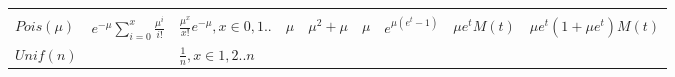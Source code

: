\documentclass[]{tufte-book}
\begin{document}
\begin{longtable}[]{@{}lllllllll@{}}
\begin{minipage}[t]{0.08\columnwidth}
\end{minipage} & \begin{minipage}[t]{0.08\columnwidth}\raggedright
\strut
\end{minipage} & \begin{minipage}[t]{0.08\columnwidth}\raggedright
\strut
\end{minipage} & \begin{minipage}[t]{0.08\columnwidth}\raggedright
\strut
\end{minipage}\tabularnewline
\begin{minipage}[t]{0.08\columnwidth}\raggedright
\(Pois(\mu)\)\strut
\end{minipage} & \begin{minipage}[t]{0.08\columnwidth}\raggedright
\(e^{-\mu}\sum_{i=0}^x\frac{\mu^i}{i!}\)\strut
\end{minipage} & \begin{minipage}[t]{0.08\columnwidth}\raggedright
\(\frac{\mu^x}{x!}e^{-\mu},x \in 0,1..\)\strut
\end{minipage} & \begin{minipage}[t]{0.08\columnwidth}\raggedright
\(\mu\)\strut
\end{minipage} & \begin{minipage}[t]{0.08\columnwidth}\raggedright
\(\mu^2+\mu\)\strut
\end{minipage} & \begin{minipage}[t]{0.08\columnwidth}\raggedright
\(\mu\)\strut
\end{minipage} & \begin{minipage}[t]{0.08\columnwidth}\raggedright
\(e^{\mu(e^t-1)}\)\strut
\end{minipage} & \begin{minipage}[t]{0.08\columnwidth}\raggedright
\(\mu e^tM(t)\)\strut
\end{minipage} & \begin{minipage}[t]{0.08\columnwidth}\raggedright
\(\mu e^t(1+\mu e^t)M(t)\)\strut
\end{minipage}\tabularnewline
\begin{minipage}[t]{0.08\columnwidth}\raggedright
\(Unif(n)\)\strut
\end{minipage} & \begin{minipage}[t]{0.08\columnwidth}\raggedright
\strut
\end{minipage} & \begin{minipage}[t]{0.08\columnwidth}\raggedright
\(\frac{1}n,x \in 1,2..n\)\strut
\end{minipage} & \begin{minipage}[t]{0.08\columnwidth}\raggedright

\end{minipage}
\end{longtable}
\end{document}
